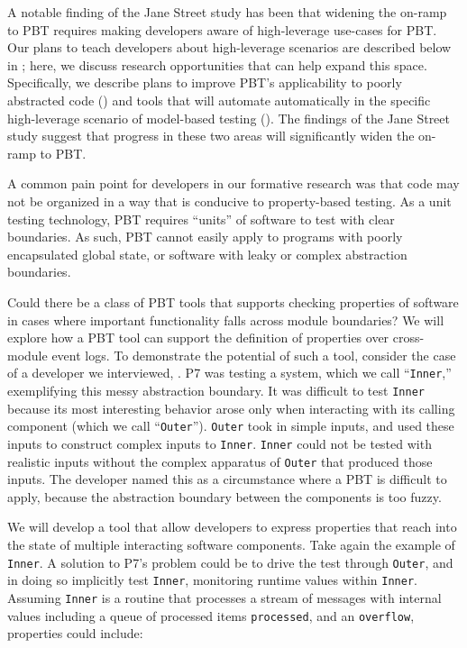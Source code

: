 A notable finding of the Jane Street study has been that widening the
on-ramp to PBT requires making developers aware of high-leverage
use-cases for PBT. Our plans to teach developers about high-leverage
scenarios are described below in ; here,
we discuss research opportunities that can help expand this space.
Specifically, we describe plans to improve PBT's applicability to
poorly abstracted code () and
tools that will automate automatically in the specific high-leverage
scenario of model-based testing ().
The findings of the Jane Street study suggest that progress in these
two areas will significantly widen the on-ramp to PBT.

A common pain point for developers in our formative research
was that code may not be organized in a way that is conducive to property-based
testing. As a unit testing technology, PBT requires ``units'' of software to
test with clear boundaries. As such, PBT cannot easily apply to programs with
poorly encapsulated global state, or software with leaky or complex abstraction
boundaries.

Could there be a class of PBT tools that supports checking properties of
software in cases where important functionality falls across module boundaries?
We will explore how a PBT tool can support the definition of properties over
cross-module event logs. To demonstrate the potential of such a tool, consider
the case of a developer we interviewed, . P7 was testing
a system, which we call ``\lstinline{Inner},'' exemplifying this messy
abstraction
boundary. It was difficult to test \lstinline{Inner} because
its most interesting behavior arose only when interacting with its calling
component (which we call ``\lstinline{Outer}'').
\lstinline{Outer} took in simple inputs, and used these inputs to construct
complex inputs to \lstinline{Inner}. \lstinline{Inner} could not be tested with
realistic inputs without the complex apparatus of \lstinline{Outer} that
produced those inputs. The developer named this as a circumstance where a
PBT is difficult to apply, because the abstraction boundary between the
components is too fuzzy.

We will develop a tool that allow developers to express properties that reach
into the state of multiple interacting software components. Take again the
example of \lstinline{Inner}. A solution to P7's problem could be to drive the
test through \lstinline{Outer}, and in doing so implicitly test
\lstinline{Inner}, monitoring runtime values within \lstinline{Inner}. Assuming
\lstinline{Inner} is a routine that processes a stream of messages with internal
values including a queue of processed items \lstinline{processed}, and an
\lstinline{overflow}, properties could include:

